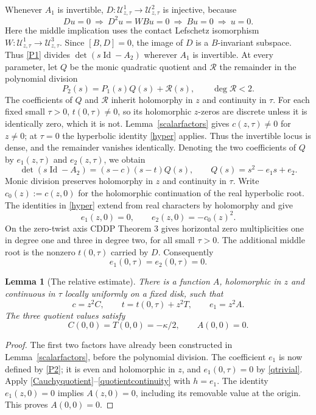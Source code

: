 \documentclass[11pt,letterpaper,reqno]{amsart}
\newtheorem{lemma}[theorem]{Lemma}
\theoremstyle{remark}
\newcommand{\Id}{\operatorname{Id}}
\newcommand{\cU}{\mathcal U}
\begin{document}
Whenever $A_1$ is invertible,
$D:\cU^1_{z,\tau}\to\cU^2_{z,\tau}$ is
injective, because
\[
 Du=0\ \Longrightarrow\ D^2u=WBu=0
 \ \Longrightarrow\ Bu=0\ \Longrightarrow\ u=0.
\]
Here the middle implication uses the contact Lefschetz isomorphism
$W:\cU^1_{z,\tau}\to\cU^3_{z,\tau}$. Since $[B,D]=0$, the image
of $D$ is a $B$-invariant subspace. Thus \eqref{P1} divides
$\det(s\Id-A_2)$ wherever $A_1$ is invertible. At every parameter,
let $Q$ be the monic quadratic quotient and $\mathcal R$ the
remainder in the polynomial division
\[
 P_2(s)=P_1(s)Q(s)+\mathcal R(s),\qquad
 \deg\mathcal R<2.
\]
The coefficients of $Q$ and $\mathcal R$ inherit holomorphy in $z$
and continuity in $\tau$.
For each fixed small $\tau>0$, $t(0,\tau)\neq0$, so its holomorphic
$z$-zeros are discrete unless it is identically zero, which it is not.
Lemma~\ref{scalarfactors} gives $c(z,\tau)\ne0$ for
$z\ne0$; at $\tau=0$ the hyperbolic identity \eqref{hyper} applies. Thus the invertible
locus is dense, and the remainder vanishes identically. Denoting the
two coefficients of $Q$ by $e_1(z,\tau)$ and $e_2(z,\tau)$, we obtain
\begin{equation}\label{P2}
 \det(s\Id-A_2)=(s-c)(s-t)Q(s),\qquad
 Q(s)=s^2-e_1s+e_2.
\end{equation}
Monic division preserves holomorphy in $z$ and continuity in $\tau$.
Write $c_0(z):=c(z,0)$ for the holomorphic continuation of the real
hyperbolic root. The identities in \eqref{hyper} extend from real
characters by holomorphy and give
\begin{equation}\label{qhyper}
 e_1(z,0)=0,\qquad e_2(z,0)=-c_0(z)^2.
\end{equation}
On the zero-twist axis CDDP Theorem 3 gives horizontal zero
multiplicities one in degree one and three in degree two, for all
small $\tau>0$. The additional middle root is the nonzero $t(0,\tau)$
carried by $D$. Consequently
\begin{equation}\label{qtrivial}
 e_1(0,\tau)=e_2(0,\tau)=0.
\end{equation}


\begin{lemma}[The relative estimate]\label{relative}
There is a function $A$, holomorphic in $z$ and continuous in $\tau$
locally uniformly on a fixed disk, such that
\begin{equation}\label{factors}
 c=z^2C,\qquad t=t(0,\tau)+z^2T,\qquad e_1=z^2A.
\end{equation}
The three quotient values satisfy
\begin{equation}\label{limits}
 C(0,0)=T(0,0)=-\kappa/2,\qquad A(0,0)=0.
\end{equation}
\end{lemma}
\begin{proof}
The first two factors have already been constructed in
Lemma~\ref{scalarfactors}, before the polynomial division. The
coefficient $e_1$ is now defined by \eqref{P2}; it is even and
holomorphic in $z$, and $e_1(0,\tau)=0$ by \eqref{qtrivial}.
Apply \eqref{Cauchyquotient}--\eqref{quotientcontinuity} with $h=e_1$.
The identity $e_1(z,0)=0$ implies $A(z,0)=0$, including its removable
value at the origin. This proves $A(0,0)=0$.
\end{proof}
\end{document}
